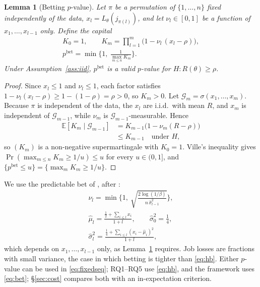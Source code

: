 \documentclass[3p,twocolumn,10pt]{elsarticle}
\newtheorem{lemma}{Lemma}
\theoremstyle{definition}
\begin{document}
\begin{lemma}[Betting $p$-value]
\label{lem:bet}
Let $\pi$ be a permutation of $\{1,\dots,n\}$ fixed independently of the data, $x_l=L_\theta(j_{\pi(l)})$, and let $\nu_l\in[0,1]$ be a function of $x_1,\dots,x_{l-1}$ only. Define the capital
\begin{equation}
\begin{gathered}
K_0=1,\qquad K_m=\prod_{l=1}^{m}\big(1-\nu_l\,(x_l-\rho)\big),\\
p^{\mathrm{bet}}=\min\Big\{1,\ \frac{1}{\max_{m\le n}K_m}\Big\}.
\end{gathered}
\label{eq:bet}
\end{equation}
Under Assumption~\ref{ass:iid}, $p^{\mathrm{bet}}$ is a valid $p$-value for $H:R(\theta)\ge\rho$.
\end{lemma}
\begin{proof}
Since $x_l\le1$ and $\nu_l\le1$, each factor satisfies $1-\nu_l(x_l-\rho)\ge1-(1-\rho)=\rho>0$, so $K_m>0$. Let $\mathcal{G}_m=\sigma(x_1,\dots,x_m)$. Because $\pi$ is independent of the data, the $x_l$ are i.i.d.\ with mean $R$, and $x_m$ is independent of $\mathcal{G}_{m-1}$, while $\nu_m$ is $\mathcal{G}_{m-1}$-measurable. Hence
\[
\begin{aligned}
\mathbb{E}[K_m\mid\mathcal{G}_{m-1}]&=K_{m-1}\big(1-\nu_m(R-\rho)\big)\\
&\le K_{m-1}\quad\text{under }H,
\end{aligned}
\]
so $(K_m)$ is a non-negative supermartingale with $K_0=1$. Ville's inequality gives $\Pr(\max_{m\le n}K_m\ge1/u)\le u$ for every $u\in(0,1]$, and $\{p^{\mathrm{bet}}\le u\}=\{\max_mK_m\ge1/u\}$.
\end{proof}

\noindent We use the predictable bet of \citet{bates2021rcps}, after \citet{waudbysmith2024betting}:
\begin{equation}
\begin{gathered}
\nu_l=\min\Big\{1,\ \sqrt{\tfrac{2\log(1/\beta)}{n\,\hat\sigma^2_{l-1}}}\Big\},\\
\hat\mu_l=\frac{\tfrac12+\sum_{i\le l}x_i}{1+l},\qquad \hat\sigma^2_0=\tfrac14,\\
\hat\sigma^2_l=\frac{\tfrac14+\sum_{i\le l}(x_i-\hat\mu_i)^2}{1+l},
\end{gathered}
\label{eq:nu}
\end{equation}
which depends on $x_1,\dots,x_{l-1}$ only, as Lemma~\ref{lem:bet} requires. Job losses are fractions with small variance, the case in which betting is tighter than \eqref{eq:hb}. Either $p$-value can be used in \eqref{eq:fixedseq}; RQ1--RQ5 use \eqref{eq:hb}, and the framework uses \eqref{eq:bet}; \S\ref{sec:cost} compares both with an in-expectation criterion.
\end{document}
